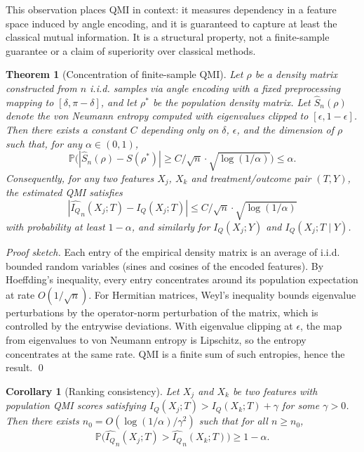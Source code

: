 \documentclass{svproc}
\newcommand{\QMI}{I_Q}
\newtheorem{theorem}{Theorem}
\newtheorem{corollary}{Corollary}
\begin{document}
This observation places QMI in context: it measures dependency in a feature space induced by angle encoding, and it is guaranteed to capture at least the classical mutual information. It is a structural property, not a finite-sample guarantee or a claim of superiority over classical methods.

\begin{theorem}[Concentration of finite-sample QMI]
\label{thm:qmi_concentration}
Let $\rho$ be a density matrix constructed from $n$ i.i.d. samples via angle encoding with a fixed preprocessing mapping to $[\delta, \pi-\delta]$, and let $\rho^*$ be the population density matrix. Let $\widehat S_n(\rho)$ denote the von Neumann entropy computed with eigenvalues clipped to $[\epsilon, 1-\epsilon]$. Then there exists a constant $C$ depending only on $\delta$, $\epsilon$, and the dimension of $\rho$ such that, for any $\alpha \in (0,1)$,
\begin{equation}
    \mathbb{P}\bigl(|\widehat S_n(\rho) - S(\rho^*)| \ge C/\sqrt{n} \cdot \sqrt{\log(1/\alpha)}\bigr) \le \alpha.
\end{equation}
Consequently, for any two features $X_j$, $X_k$ and treatment/outcome pair $(T,Y)$, the estimated QMI satisfies
\begin{equation}
    |\widehat{\QMI}_n(X_j; T) - \QMI(X_j; T)| \le C/\sqrt{n} \cdot \sqrt{\log(1/\alpha)}
\end{equation}
with probability at least $1-\alpha$, and similarly for $\QMI(X_j; Y)$ and $\QMI(X_j; T \mid Y)$.
\end{theorem}

\textit{Proof sketch.} Each entry of the empirical density matrix is an average of i.i.d. bounded random variables (sines and cosines of the encoded features). By Hoeffding's inequality, every entry concentrates around its population expectation at rate $O(1/\sqrt{n})$. For Hermitian matrices, Weyl's inequality bounds eigenvalue perturbations by the operator-norm perturbation of the matrix, which is controlled by the entrywise deviations. With eigenvalue clipping at $\epsilon$, the map from eigenvalues to von Neumann entropy is Lipschitz, so the entropy concentrates at the same rate. QMI is a finite sum of such entropies, hence the result. \qed

\begin{corollary}[Ranking consistency]
\label{cor:ranking}
Let $X_j$ and $X_k$ be two features with population QMI scores satisfying $\QMI(X_j; T) > \QMI(X_k; T) + \gamma$ for some $\gamma > 0$. Then there exists $n_0 = O(\log(1/\alpha)/\gamma^2)$ such that for all $n \ge n_0$,
\begin{equation}
    \mathbb{P}\bigl(\widehat{\QMI}_n(X_j; T) > \widehat{\QMI}_n(X_k; T)\bigr) \ge 1 - \alpha.
\end{equation}
\end{corollary}
\end{document}
